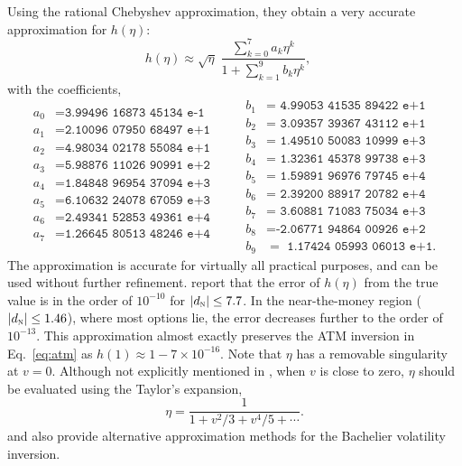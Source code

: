 \documentclass[a4paper,review]{elsarticle}
\newcommand{\norm}{\textsc{n}}
\begin{document}
Using the rational Chebyshev approximation, they obtain a very accurate approximation for $h(\eta)$:
$$ h(\eta) \approx \sqrt{\eta}\; \frac{\sum_{k=0}^{7} a_k \eta^k}{1 + \sum_{k=1}^{9} b_k \eta^k}, \quad 
$$
with the coefficients,
\begin{equation}
\begin{matrix}
a_0 &= \texttt{3.99496 16873 45134 e-1}\\
a_1 &= \texttt{2.10096 07950 68497 e+1}\\
a_2 &= \texttt{4.98034 02178 55084 e+1}\\
a_3 &= \texttt{5.98876 11026 90991 e+2}\\
a_4 &= \texttt{1.84848 96954 37094 e+3}\\
a_5 &= \texttt{6.10632 24078 67059 e+3}\\
a_6 &= \texttt{2.49341 52853 49361 e+4}\\
a_7 &= \texttt{1.26645 80513 48246 e+4}\\
\end{matrix}
\quad \quad
\begin{matrix}
b_1 &= \texttt{ 4.99053 41535 89422 e+1}\\
b_2 &= \texttt{ 3.09357 39367 43112 e+1}\\
b_3 &= \texttt{ 1.49510 50083 10999 e+3}\\
b_4 &= \texttt{ 1.32361 45378 99738 e+3}\\
b_5 &= \texttt{ 1.59891 96976 79745 e+4}\\
b_6 &= \texttt{ 2.39200 88917 20782 e+4}\\
b_7 &= \texttt{ 3.60881 71083 75034 e+3}\\
b_8 &= \texttt{-2.06771 94864 00926 e+2}\\
b_9 &= \texttt{ 1.17424 05993 06013 e+1}.
\end{matrix}
\end{equation}
The approximation is accurate for virtually all practical purposes, and can be used without further refinement. \citet{choi2009impvol} report that the error of $h(\eta)$ from the true value is in the order of $10^{-10}$ for $|d_\norm| \le 7.7$. In the near-the-money region ($|d_\norm| \le 1.46$), where most options lie, the error decreases further to the order of $10^{-13}$. This approximation almost exactly preserves the ATM inversion in Eq.~\eqref{eq:atm} as $h(1) \approx 1 - 7\times 10^{-16}$. Note that $\eta$ has a removable singularity at $v=0$. Although not explicitly mentioned in \citet{choi2009impvol}, when $v$ is close to zero, $\eta$ should be evaluated using the Taylor's expansion,
$$ \eta = \frac{1}{1+v^2/3+v^4/5+\cdots}.
$$
\citet{jackel2017normvol} and \citet{floc2016fast} also provide alternative approximation methods for the Bachelier volatility inversion.
\end{document}
